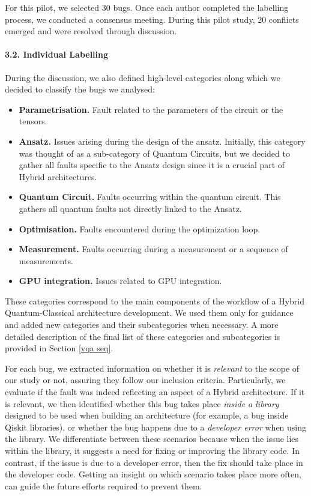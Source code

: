 For this pilot, we selected 30 bugs. Once each author completed the labelling process, we conducted a consensus meeting. During this pilot study, 20 conflicts emerged and were resolved through discussion.  



\paragraph*{3.2. Individual Labelling}


During the discussion, we also defined high-level categories along which we decided to classify the bugs we analysed:

\begin{itemize}\itemsep0em

\item  \textbf{Parametrisation.} Fault related to the parameters of the circuit or the tensors.  
\item  \textbf{Ansatz.} Issues arising during the design of the ansatz. Initially, this category was thought of as a sub-category of Quantum Circuits, but we decided to gather all faults specific to the Ansatz design since it is a crucial part of Hybrid architectures.
\item  \textbf{Quantum Circuit.} Faults occurring within the quantum circuit. This gathers all quantum faults not directly linked to the Ansatz.
\item  \textbf{Optimisation.} Faults encountered during the optimization loop. 
\item  \textbf{Measurement.}  Faults occurring during a measurement or a sequence of measurements.
\item  \textbf{GPU integration.}  Issues related to GPU integration.
\end{itemize}


These categories correspond to the main components of the workflow of a Hybrid Quantum-Classical architecture development. We used them only for guidance and added new categories and their subcategories when necessary. A more detailed description of the final list of these categories and subcategories is provided in Section \ref{vqa seq}.

For each bug, we extracted information on whether it is \textit{relevant} to the scope of our study or not, assuring they follow our inclusion criteria. Particularly, we evaluate if the fault was indeed reflecting an aspect of a Hybrid architecture. If it is relevant, we then identified whether this bug takes place \textit{inside a library} designed to be used when building an architecture (for example, a bug inside Qiskit libraries), or whether the bug happens due to a \textit{developer error} when using the library. We differentiate between these scenarios because when the issue lies within the library, it suggests a need for fixing or improving the library code. In contrast, if the issue is due to a developer error, then the fix should take place in the developer code. Getting an insight on which scenario takes place more often, can guide the future efforts required to prevent them. 

